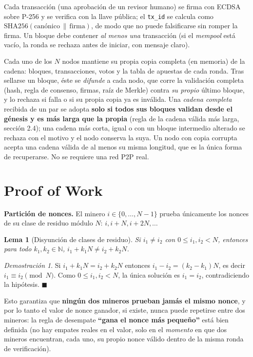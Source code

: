\documentclass[11pt]{article}
\newtheorem{lemma}{Lema}
\theoremstyle{remark}
\newtheorem*{proof*}{Demostración}
\begin{document}
Cada transacción (una aprobación de un revisor humano) se firma con ECDSA sobre P-256 y se verifica con la llave pública;
el \texttt{tx\_id} se calcula como $\mathrm{SHA256}(\text{canónico}\,\|\,\text{firma})$, de modo que no puede falsificarse sin
romper la firma. Un bloque debe contener \emph{al menos una} transacción (si el \emph{mempool} está vacío, la ronda se
rechaza antes de iniciar, con mensaje claro).

Cada uno de los $N$ nodos mantiene su propia copia completa (en memoria) de la cadena: bloques, transacciones, votos y la
tabla de apuestas de cada ronda. Tras sellarse un bloque, éste se \emph{difunde} a cada nodo, que corre la validación completa
(hash, regla de consenso, firmas, raíz de Merkle) contra \emph{su propio} último bloque, y lo rechaza si falla o si su propia
copia ya es inválida. Una \emph{cadena completa} recibida de un par se adopta \textbf{solo si todos sus bloques validan desde
el génesis y es más larga que la propia} (regla de la cadena válida más larga, sección 2.4); una cadena más corta, igual o
con un bloque intermedio alterado se rechaza con el motivo y el nodo conserva la suya. Un nodo con copia corrupta acepta una
cadena válida de al menos su misma longitud, que es la única forma de recuperarse. No se requiere una red P2P real.

\section{Proof of Work}
\textbf{Partición de nonces.} El minero $i\in\{0,\dots,N-1\}$ prueba únicamente los nonces de su clase de residuo módulo
$N$: $i, i+N, i+2N,\dots$

\begin{lemma}[Disyunción de clases de residuo]
Si $i_1\neq i_2$ con $0\le i_1,i_2<N$, entonces para todo $k_1,k_2\in\mathbb{N}$, $i_1+k_1N \neq i_2+k_2N$.
\end{lemma}
\begin{proof*}
Si $i_1+k_1N=i_2+k_2N$ entonces $i_1-i_2=(k_2-k_1)N$, es decir $i_1\equiv i_2\pmod N$. Como $0\le i_1,i_2<N$, la única
solución es $i_1=i_2$, contradiciendo la hipótesis. $\blacksquare$
\end{proof*}
Esto garantiza que \textbf{ningún dos mineros prueban jamás el mismo nonce}, y por lo tanto el valor de nonce ganador, si
existe, nunca puede repetirse entre dos mineros: la regla de desempate \textbf{``gana el nonce más pequeño''} está bien
definida (no hay empates reales en el valor, solo en el \emph{momento} en que dos mineros encuentran, cada uno, su propio
nonce válido dentro de la misma ronda de verificación).
\end{document}
